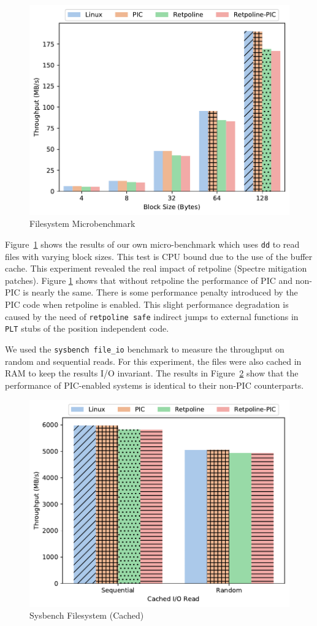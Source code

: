 \begin{figure}[ht!]
\centering
\includegraphics[width=0.7\columnwidth]{charts/file_micro.pdf}
\caption{Filesystem Microbenchmark}
\label{fig:file_micro}
\end{figure}

Figure~\ref{fig:file_micro} shows the results of our own micro-benchmark which uses \verb|dd| to read files with varying block sizes. This test is CPU bound due to the use of the buffer cache. This experiment revealed the real impact of retpoline (Spectre mitigation patches). Figure \ref{fig:file_micro} shows that without retpoline the performance of PIC and non-PIC is nearly the same. There is some performance penalty introduced by the PIC code when retpoline is enabled. This slight performance degradation is caused by the need of \verb|retpoline safe| indirect jumps to external functions in \verb|PLT| stubs of the position independent code.

We used  the \verb|sysbench file_io| benchmark to measure the throughput on random and sequential reads. For this experiment, the files were also cached in RAM to keep the results I/O invariant. The results in Figure~\ref{fig:sysbench_file} show that the performance of PIC-enabled systems is identical to their non-PIC counterparts.

\begin{figure}[ht!]
\centering
\includegraphics[width=0.7\columnwidth]{charts/sysbench_io.pdf}
\caption{Sysbench Filesystem (Cached)}
\label{fig:sysbench_file}
\end{figure}

